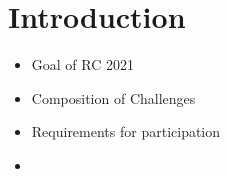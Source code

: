 \section{Introduction}

\begin{itemize}
    \item Goal of RC 2021
    \item Composition of Challenges
    \item Requirements for participation
    \item 
\end{itemize}